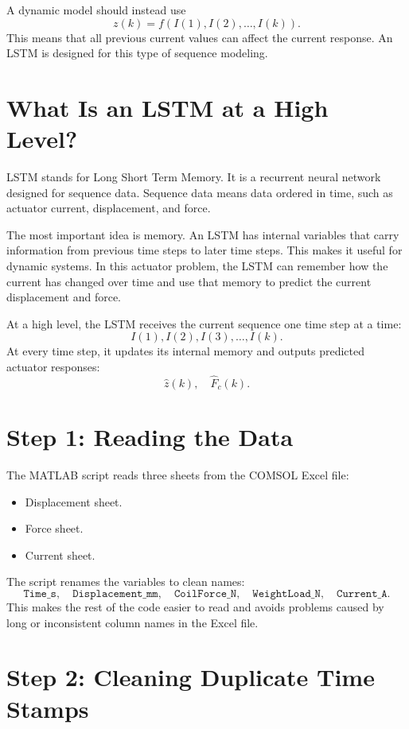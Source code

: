 \documentclass[11pt]{article}
\begin{document}
A dynamic model should instead use
\begin{equation}
    z(k) = f(I(1), I(2), \ldots, I(k)).
\end{equation}
This means that all previous current values can affect the current response. An LSTM is designed for this type of sequence modeling.

\section{What Is an LSTM at a High Level?}

LSTM stands for Long Short Term Memory. It is a recurrent neural network designed for sequence data. Sequence data means data ordered in time, such as actuator current, displacement, and force.

The most important idea is memory. An LSTM has internal variables that carry information from previous time steps to later time steps. This makes it useful for dynamic systems. In this actuator problem, the LSTM can remember how the current has changed over time and use that memory to predict the current displacement and force.

At a high level, the LSTM receives the current sequence one time step at a time:
\[
    I(1), I(2), I(3), \ldots, I(k).
\]
At every time step, it updates its internal memory and outputs predicted actuator responses:
\[
    \hat{z}(k), \quad \hat{F}_c(k).
\]

\section{Step 1: Reading the Data}

The MATLAB script reads three sheets from the COMSOL Excel file:
\begin{itemize}[leftmargin=1.2cm]
    \item Displacement sheet.
    \item Force sheet.
    \item Current sheet.
\end{itemize}

The script renames the variables to clean names:
\[
    \texttt{Time\_s},\quad \texttt{Displacement\_mm},\quad \texttt{CoilForce\_N},\quad \texttt{WeightLoad\_N},\quad \texttt{Current\_A}.
\]
This makes the rest of the code easier to read and avoids problems caused by long or inconsistent column names in the Excel file.

\section{Step 2: Cleaning Duplicate Time Stamps}
\end{document}
